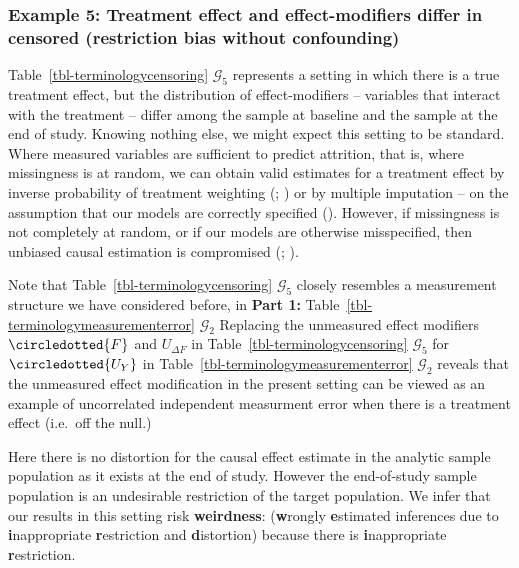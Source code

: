 \documentclass[
  single column]{article}
\begin{document}
\subsubsection{Example 5: Treatment effect and effect-modifiers differ
in censored (restriction bias without
confounding)}\label{example-5-treatment-effect-and-effect-modifiers-differ-in-censored-restriction-bias-without-confounding}

Table~\ref{tbl-terminologycensoring} \(\mathcal{G}_5\) represents a
setting in which there is a true treatment effect, but the distribution
of effect-modifiers -- variables that interact with the treatment --
differ among the sample at baseline and the sample at the end of study.
Knowing nothing else, we might expect this setting to be standard. Where
measured variables are sufficient to predict attrition, that is, where
missingness is at random, we can obtain valid estimates for a treatment
effect by inverse probability of treatment weighting
(;
) or by multiple
imputation -- on the assumption that our models are correctly specified
(). However, if
missingness is not completely at random, or if our models are otherwise
misspecified, then unbiased causal estimation is compromised
(;
).

Note that Table~\ref{tbl-terminologycensoring} \(\mathcal{G}_5\) closely
resembles a measurement structure we have considered before, in
\textbf{Part 1:} Table~\ref{tbl-terminologymeasurementerror}
\(\mathcal{G}_2\) Replacing the unmeasured effect modifiers
\(\circledotted{F}\) and \(U_{\Delta F}\) in
Table~\ref{tbl-terminologycensoring} \(\mathcal{G}_5\) for
\(\circledotted{U_Y}\) in Table~\ref{tbl-terminologymeasurementerror}
\(\mathcal{G}_2\) reveals that the unmeasured effect modification in the
present setting can be viewed as an example of uncorrelated independent
measurment error when there is a treatment effect (i.e.~off the null.)

Here there is no distortion for the causal effect estimate in the
analytic sample population as it exists at the end of study. However the
end-of-study sample population is an undesirable restriction of the
target population. We infer that our results in this setting risk
\textbf{weirdness}: (\textbf{w}rongly \textbf{e}stimated inferences due
to \textbf{i}nappropriate \textbf{r}estriction and \textbf{d}istortion)
because there is \textbf{i}nappropriate \textbf{r}estriction.
\end{document}
